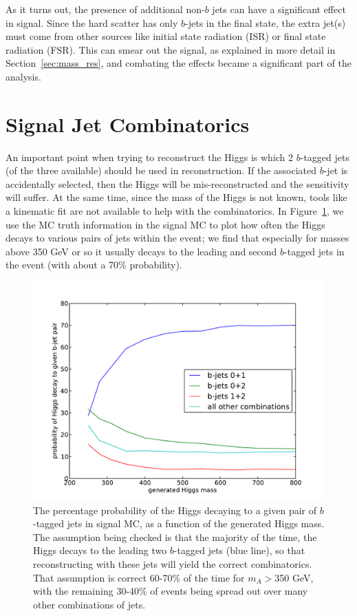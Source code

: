 
As it turns out, the presence of additional non-$b$ jets can have a significant 
effect in signal.  Since the hard scatter has only $b$-jets in the final state, the
extra jet(s) must come from other sources like initial state radiation (ISR) or 
final state radiation (FSR).  This can smear out the signal, as explained in more detail
in Section~\ref{sec:mass_res}, and combating the effects became a significant part of the
analysis.


\section{Signal Jet Combinatorics}
\label{sec:combinatorics}
An important point when trying to reconstruct the Higgs is which 2 $b$-tagged jets (of the
three available) should be used in reconstruction.  If the associated $b$-jet is accidentally
selected, then the Higgs will be mis-reconstructed and the sensitivity will suffer.  At the same time,
since the mass of the Higgs is not known, tools like a kinematic fit are not available to
help with the combinatorics.  In Figure~\ref{fig:combinatorics}, we use the MC truth
information in the signal MC to plot how often the Higgs decays to various pairs of jets
within the event; we find that especially for masses above 350 GeV or so it usually decays to
the leading and second $b$-tagged jets in the event (with about a 70\% probability).
    
\begin{figure}[hbt]
  \center
  \includegraphics[width=0.78\linewidth]{SignalKin/combinatorics.pdf}
  \caption{The percentage probability of the Higgs decaying to a given pair of $b$-tagged jets in signal MC,
    as a function of the generated Higgs mass.  The assumption being checked is that the majority of
    the time, the Higgs decays to the leading two $b$-tagged jets (blue line), so that reconstructing with these jets
    will yield the correct combinatorics.  That assumption is correct 60-70\% of the time for $m_A>$350 GeV,
    with the remaining 30-40\% of events being spread out over many other combinations of jets.
    \label{fig:combinatorics}}
\end{figure}
                
